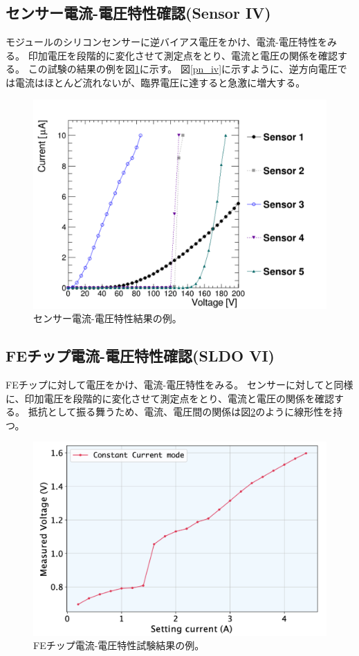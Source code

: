 \subsection{センサー電流-電圧特性確認(Sensor IV)}
モジュールのシリコンセンサーに逆バイアス電圧をかけ、電流-電圧特性をみる。
印加電圧を段階的に変化させて測定点をとり、電流と電圧の関係を確認する。
この試験の結果の例を図\ref{sensor_IV_result}に示す。
図\ref{pn_iv}に示すように、逆方向電圧では電流はほとんど流れないが、臨界電圧に達すると急激に増大する。

\begin{figure}[bpt]\centering
\includegraphics[width=14cm]{sensor_IV_result}
\caption[センサー電流-電圧特性結果の例]{センサー電流-電圧特性結果の例。}
\label{sensor_IV_result}
\end{figure}

\subsection{FEチップ電流-電圧特性確認(SLDO VI)}
FEチップに対して電圧をかけ、電流-電圧特性をみる。
センサーに対してと同様に、印加電圧を段階的に変化させて測定点をとり、電流と電圧の関係を確認する。
抵抗として振る舞うため、電流、電圧間の関係は図\ref{SLDO_VI_result}のように線形性を持つ。

\begin{figure}[bpt]\centering
\includegraphics[width=14cm]{SLDO_VI_result}
\caption[FEチップ電流-電圧特性試験結果の例。]{FEチップ電流-電圧特性試験結果の例。}
\label{SLDO_VI_result}
\end{figure}

